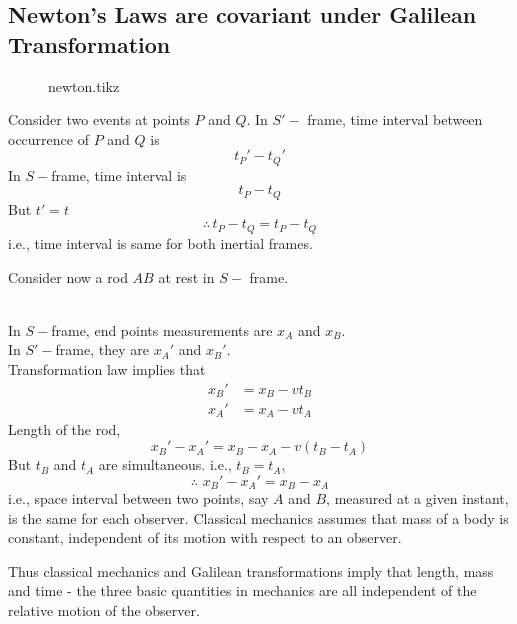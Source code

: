 \documentclass[../main-sheet.tex]{subfiles}
\begin{document}
\subsection{Newton's Laws are covariant under Galilean Transformation}
\begin{figure}[H]
    \centering
    {newton.tikz}
\end{figure}
Consider two events at points \(P \) and \(Q \). In \(S'-\) frame, time interval between occurrence of \(P \) and \(Q \) is 
\[t_P'-t_Q'\]
In \(S-\)frame, time interval is
\[t_P-t_Q\]
But \(t'=t\)
\[\therefore \,t_P-t_Q=t_P-t_Q\]
i.e., time interval is same for both inertial frames.

Consider now a rod \(AB \) at rest in \(S-\) frame.\hspace{3cm}\\
In \(S-\)frame, end points measurements are \(x_A \) and \(x_B \).\\
In \(S'-\)frame, they are \(x_A' \) and \(x_B' \).\\
Transformation law implies that
\begin{align*}
    x_B'&=x_B-vt_B\\
    x_A'&=x_A-vt_A
\end{align*}
Length of the rod,
\[x_B'-x_A'=x_B-x_A-v(t_B-t_A )\]
But \(t_B \) and \(t_A \) are simultaneous. i.e., \(t_B=t_A \),
\[\therefore\,\,x_B'-x_A'=x_B-x_A\]
i.e., space interval between two points, say \(A \) and \(B \), measured at a given instant, is the same for each observer. Classical mechanics assumes that mass of a body is constant, independent of its motion with respect to an observer.

Thus classical mechanics and Galilean transformations imply that length, mass and time - the three basic quantities in mechanics are all independent of the relative motion of the observer.
\end{document}
